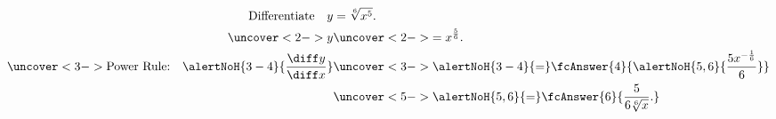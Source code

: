 \begin{frame}
\begin{example}
\abovedisplayskip=0pt
\belowdisplayskip=-15pt
\abovedisplayshortskip=0pt
\belowdisplayshortskip=0pt
\begin{align*}
\text{Differentiate}\quad y & = \sqrt[6]{x^5}.\\%
\uncover<2->{%
y %
}%
& \uncover<2->{%
 = x^{\frac{5}{6}}.
}\\%
\uncover<3->{%
\text{Power Rule:}\quad %
\alertNoH{ 3-4}{\frac{\diff y}{\diff x}} %
}%
& \uncover<3->{%
\alertNoH{ 3-4}{ =} \fcAnswer{4}{\alertNoH{5,6}{ \frac{5 x^{-\frac{1}{6}}}{6} }}
}\\%
&\uncover<5->{ \alertNoH{5,6}{=} \fcAnswer{6}{{ \frac{5}{6\sqrt[6]{x}}.}}}
\end{align*}
\end{example}
\end{frame}
